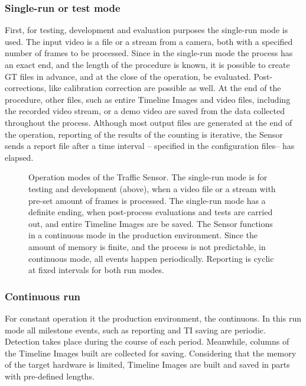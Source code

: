 \subsubsection{Single-run or test mode}\label{sec:run_modes}
First, for testing, development and evaluation purposes the single-run mode is used.
The input video is a file or a stream from a camera, both with a specified number of frames to be processed.
Since in the single-run mode the process has an exact end, and the length of the procedure is known, it is possible to create GT files in advance, and at the close of the operation, be evaluated.
Post-corrections, like calibration correction are possible as well.
At the end of the procedure, other files, such as entire Timeline Images and video files, including the recorded video stream, or a demo video are saved from the data collected throughout the process.
Although most output files are generated at the end of the operation, reporting of the results of the counting is iterative, the Sensor sends a report file after a time interval -- specified in the configuration files-- has elapsed.

\begin{figure}[!h]
	\centering
	
	\caption{Operation modes of the Traffic Sensor. The single-run mode is for testing and development (above), when a video file or a stream with pre-set amount of frames is processed. The single-run mode has a definite ending, when post-process evaluations and tests are carried out, and entire Timeline Images are be saved. The Sensor functions in a continuous mode in the production environment. Since the amount of memory is finite, and the process is not predictable, in continuous mode, all events happen periodically. Reporting is cyclic at fixed intervals for both run modes. \label{fig:run_types}}
\end{figure}
\subsubsection{Continuous run}
For constant operation it the production environment, the continuous.
In this run mode all milestone events, such as reporting and TI saving are periodic. 
Detection takes place during the course of each period. 
Meanwhile, columns of the Timeline Images built are collected for saving.
Considering that the memory of the target hardware is limited, Timeline Images are built and saved in parts with pre-defined lengths.

